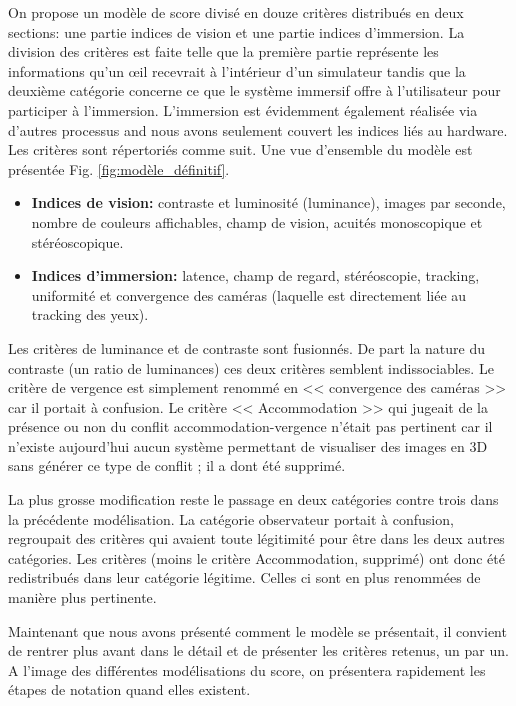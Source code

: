 	\par On propose un modèle de score divisé en douze critères distribués en deux sections: une partie indices de vision et une partie indices d'immersion. La division des critères est faite telle que la première partie représente les informations qu'un œil recevrait à l'intérieur d'un simulateur tandis que la deuxième catégorie concerne ce que le système immersif offre à l'utilisateur pour participer à l'immersion. L'immersion est évidemment également réalisée via d'autres processus and nous avons seulement couvert les indices liés au hardware. Les critères sont répertoriés comme suit. Une vue d'ensemble du modèle est présentée Fig. \ref{fig:modèle_définitif}.
	
	\begin{itemize}\itemsep12pt
		\item \textbf{Indices de vision:} contraste et luminosité (luminance), images par seconde, nombre de couleurs affichables, champ de vision, acuités monoscopique et stéréoscopique.
		\item \textbf{Indices d'immersion:} latence, champ de regard, stéréoscopie, tracking, uniformité et convergence des caméras (laquelle est directement liée au tracking des yeux).
	\end{itemize}
	
	\par Les critères de luminance et de contraste sont fusionnés. De part la nature du contraste (un ratio de luminances) ces deux critères semblent indissociables. Le critère de vergence est simplement renommé en << convergence des caméras >> car il portait à confusion. Le critère << Accommodation >> qui jugeait de la présence ou non du conflit accommodation-vergence n'était pas pertinent car il n'existe aujourd'hui aucun système permettant de visualiser des images en 3D sans générer ce type de conflit ; il a dont été supprimé.
	
	\par La plus grosse modification reste le passage en deux catégories contre trois dans la précédente modélisation. La catégorie observateur portait à confusion, regroupait des critères qui avaient toute légitimité pour être dans les deux autres catégories. Les critères (moins le critère Accommodation, supprimé) ont donc été redistribués dans leur catégorie légitime. Celles ci sont en plus renommées de manière plus pertinente.
	
	\par Maintenant que nous avons présenté comment le modèle se présentait, il convient de rentrer plus avant dans le détail et de présenter les critères retenus, un par un. A l'image des différentes modélisations du score, on présentera rapidement les étapes de notation quand elles existent.
	
